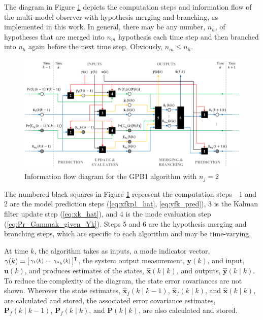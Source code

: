 The diagram in Figure \ref{fig:gpb2-infoflow} depicts the computation steps and information flow of the multi-model observer with hypothesis merging and branching, as implemented in this work. In general, there may be any number, $n_h$, of hypotheses that are merged into $n_m$ hypothesis each time step and then branched into $n_h$ again before the next time step. Obviously, $n_m \le n_h$.
\begin{figure}[htp]
	\centering
	\includegraphics[width=15.5cm]{images/gpb2_infoflow.pdf}
	\caption{Information flow diagram for the GPB1 algorithm with $n_j=2$}
	\label{fig:gpb2-infoflow}
\end{figure}

The numbered black squares in Figure \ref{fig:gpb2-infoflow} represent the computation steps---1 and 2 are the model prediction steps (\ref{eq:xfkp1_hat}, \ref{eq:yfk_pred}), 3 is the Kalman filter update step (\ref{eq:xk_hat}), and 4 is the mode evaluation step (\ref{eq:Pr_Gammak_given_Yk}). Steps 5 and 6 are the hypothesis merging and branching steps, which are specific to each algorithm and may be time-varying.

At time $k$, the algorithm takes as inputs, a mode indicator vector, $\gamma(k)=\begin{bsmallmatrix} \gamma_1(k) & \cdots & \gamma_{n_h}(k) \end{bsmallmatrix}^\intercal$, the system output measurement, $\mathbf{y}(k)$, and input, $\mathbf{u}(k)$, and produces estimates of the states, $\hat{\mathbf{x}}(k \mid k)$, and outputs, $\hat{\mathbf{y}}(k \mid k)$. To reduce the complexity of the diagram, the state error covariances are not shown. Wherever the state estimates, $\hat{\mathbf{x}}_f(k \mid k-1)$, $\hat{\mathbf{x}}_f(k \mid k)$, and $\hat{\mathbf{x}}(k \mid k)$, are calculated and stored, the associated error covariance estimates, $\mathbf{P}_f(k \mid k-1)$, $\mathbf{P}_f(k \mid k)$, and $\mathbf{P}(k \mid k)$, are also calculated and stored.

